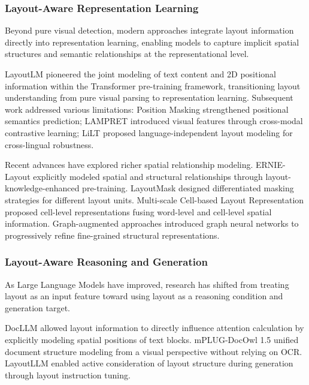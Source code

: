 \subsubsection{Layout-Aware Representation Learning}

Beyond pure visual detection, modern approaches integrate layout information directly into representation learning, enabling models to capture implicit spatial structures and semantic relationships at the representational level.

LayoutLM \cite{xu2019layoutlm} pioneered the joint modeling of text content and 2D positional information within the Transformer pre-training framework, transitioning layout understanding from pure visual parsing to representation learning. Subsequent work addressed various limitations: Position Masking \cite{saha2021position} strengthened positional semantics prediction; LAMPRET \cite{wu2021lampret} introduced visual features through cross-modal contrastive learning; LiLT \cite{wang2022lilt} proposed language-independent layout modeling for cross-lingual robustness.

Recent advances have explored richer spatial relationship modeling. ERNIE-Layout \cite{peng2022ernie_layout} explicitly modeled spatial and structural relationships through layout-knowledge-enhanced pre-training. LayoutMask \cite{tu2023layoutmask} designed differentiated masking strategies for different layout units. Multi-scale Cell-based Layout Representation \cite{shi2023multiscale_cell} proposed cell-level representations fusing word-level and cell-level spatial information. Graph-augmented approaches \cite{arshad2025graph_augmented} introduced graph neural networks to progressively refine fine-grained structural representations.

\subsubsection{Layout-Aware Reasoning and Generation}

As Large Language Models have improved, research has shifted from treating layout as an input feature toward using layout as a reasoning condition and generation target.

DocLLM \cite{wang2024docllm} allowed layout information to directly influence attention calculation by explicitly modeling spatial positions of text blocks. mPLUG-DocOwl 1.5 \cite{hu2024mplugdocowl15} unified document structure modeling from a visual perspective without relying on OCR. LayoutLLM \cite{luo2024layoutllm} enabled active consideration of layout structure during generation through layout instruction tuning.

